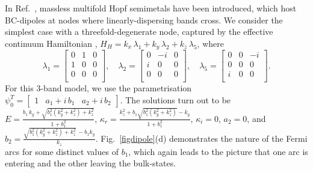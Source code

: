 \documentclass[aps,prl,twocolumn,nofootinbib,showkeys, nolongbibliography, 10pt]{revtex4-2}
\begin{document}
  
In Ref.~\cite{graf-hopf}, massless multifold Hopf semimetals have been introduced, which host BC-dipoles at nodes where linearly-dispersing bands cross. We consider the simplest case with a threefold-degenerate node, captured by the effective continuum Hamiltonian \cite{graf-hopf, hopf2, hopf3},
$ H_{H} = k_x \,\lambda_1 + k_y \,\lambda_2+ k_z\,\lambda_5$,
where
$$ \lambda_1 =  \begin{bmatrix}
 0 & 1 & 0 \\
 1 & 0 & 0 \\
 0 & 0 & 0 \\
\end{bmatrix}, \quad
\lambda_2 = \begin{bmatrix}
 0 & -i & 0 \\
 i & 0 & 0 \\
 0 & 0 & 0 \\
\end{bmatrix}, \quad
\lambda_5 = \begin{bmatrix}
 0 & 0 & -i \\
 0 & 0 & 0 \\
 i & 0 & 0 \\
\end{bmatrix} .$$
For this 3-band model, we use the parametrisation $ \psi_0^T  = \begin{bmatrix}
1 & a_1 +i \, b_1 & a_2 + i\, b_2 \end{bmatrix}$. The solutions turn out to be
$E = \frac{ b_1 \,k_y + \sqrt{b_1^2 \left(k_y^2+k_z^2\right)+k_z^2}} { 1 + b_1^2  }$,
$\kappa_r = \frac{ k_z^2 + b_1 \sqrt{b_1^2 \left(k_y^2+k_z^2\right) }-k_y}{ 1 + b_1^2}$, $\kappa_i  = 0 $,
$a_2 = 0 $, and $b_2  =  \frac{\sqrt{b_1^2 \left(k_y^2+k_z^2\right)+k_z^2}\,-b_1 k_y}{k_z}$.
Fig.~\ref{figdipole}(d) demonstrates the nature of the Fermi arcs for some distinct values of $b_1$, which again leads to the picture that one arc is entering and the other leaving the bulk-states. 
\end{document}
